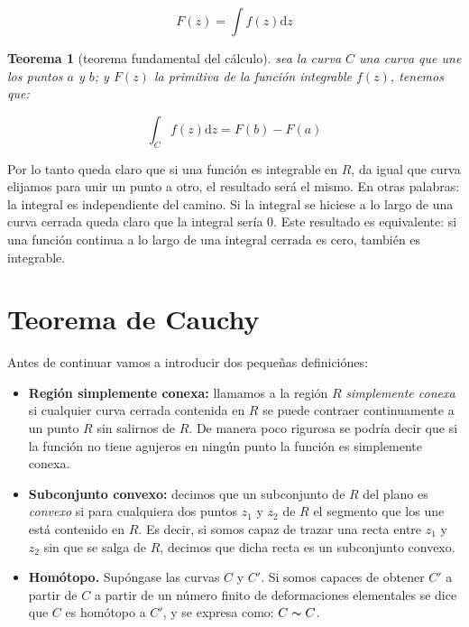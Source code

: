 \documentclass[12pt,a4paper]{book}
\newcommand{\D}{\mathrm{d}}
\newtheorem{theorem}{Teorema}[section]
\begin{document}
\begin{equation}
F(z) = \int f(z) \D z
\end{equation}

\begin{theorem}[teorema fundamental del cálculo] 
sea la curva $C$ una curva que une los puntos $a$ y $b$; y $F(z)$ la primitiva de la función integrable $f(z)$, tenemos que:

$$ \int_C f(z) \D z = F(b) - F(a) $$

\end{theorem}

Por lo tanto queda claro que si una función es integrable en $R$, da igual que curva elijamos para unir un punto a otro, el resultado será el mismo. En otras palabras: la integral es independiente del camino. Si la integral se hiciese a lo largo de una curva cerrada queda claro que la integral sería 0. Este resultado es equivalente: si una función continua a lo largo de una integral cerrada es cero, también es integrable. \\ %

\section{Teorema de Cauchy}

Antes de continuar vamos a introducir dos pequeñas definiciónes: 

\begin{itemize}
\item \textbf{Región simplemente conexa:} llamamos a la región $R$ \textit{simplemente conexa} si cualquier curva cerrada contenida en $R$ se puede contraer continuamente a un punto $R$ sin salirnos de $R$. De manera poco rigurosa se podría decir que si la función no tiene agujeros en ningún punto la función es simplemente conexa. %

\item \textbf{Subconjunto convexo:} decimos que un subconjunto de $R$ del plano es \textit{convexo} si para cualquiera dos puntos $z_1$ y $z_2$ de $R$ el segmento que los une está contenido en $R$. Es decir, si somos capaz de trazar una recta entre $z_1$ y $z_2$ sin que se salga de $R$, decimos que dicha recta es un subconjunto convexo. %

\item \textbf{Homótopo.} Supóngase las curvas $C$ y $C'$. Si somos capaces de obtener $C'$ a partir de $C$ a partir de un número finito de deformaciones elementales se dice que $C$ es homótopo a $C'$, y se expresa como: $C \thicksim C$.  %

\end{itemize}
\end{document}
